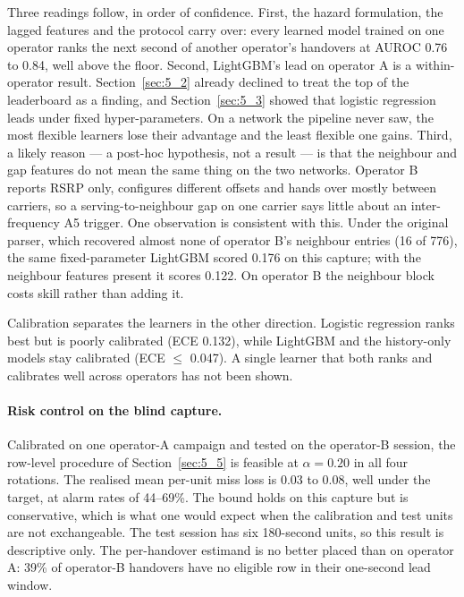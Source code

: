 Three readings follow, in order of confidence. First, the hazard formulation, the lagged features and the protocol carry over: every learned model trained on one operator ranks the next second of another operator's handovers at AUROC 0.76 to 0.84, well above the floor. Second, LightGBM's lead on operator A is a within-operator result. Section~\ref{sec:5_2} already declined to treat the top of the leaderboard as a finding, and Section~\ref{sec:5_3} showed that logistic regression leads under fixed hyper-parameters. On a network the pipeline never saw, the most flexible learners lose their advantage and the least flexible one gains. Third, a likely reason --- a post-hoc hypothesis, not a result --- is that the neighbour and gap features do not mean the same thing on the two networks. Operator B reports RSRP only, configures different offsets and hands over mostly between carriers, so a serving-to-neighbour gap on one carrier says little about an inter-frequency A5 trigger. One observation is consistent with this. Under the original parser, which recovered almost none of operator B's neighbour entries (16 of 776), the same fixed-parameter LightGBM scored 0.176 on this capture; with the neighbour features present it scores 0.122. On operator B the neighbour block costs skill rather than adding it.

Calibration separates the learners in the other direction. Logistic regression ranks best but is poorly calibrated (ECE 0.132), while LightGBM and the history-only models stay calibrated (ECE $\le$ 0.047). A single learner that both ranks and calibrates well across operators has not been shown.

\paragraph{Risk control on the blind capture.} Calibrated on one operator-A campaign and tested on the operator-B session, the row-level procedure of Section~\ref{sec:5_5} is feasible at $\alpha = 0.20$ in all four rotations. The realised mean per-unit miss loss is 0.03 to 0.08, well under the target, at alarm rates of 44--69\%. The bound holds on this capture but is conservative, which is what one would expect when the calibration and test units are not exchangeable. The test session has six 180-second units, so this result is descriptive only. The per-handover estimand is no better placed than on operator A: 39\% of operator-B handovers have no eligible row in their one-second lead window.


